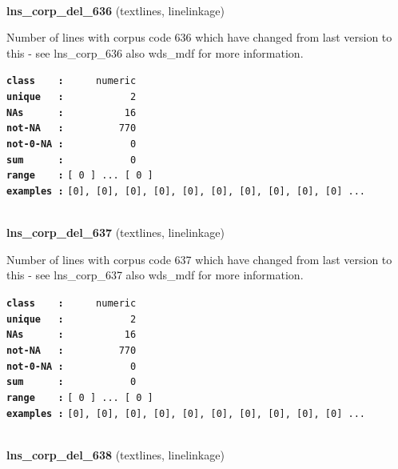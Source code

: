 \documentclass[]{article}
\begin{document}
~

\textbf{lns\_corp\_del\_636} (textlines, linelinkage)

Number of lines with corpus code 636 which have changed from last
version to this - see lns\_corp\_636 also wds\_mdf for more information.

\textbf{\texttt{class\ \ \ \ :}} \texttt{~~~~~numeric}\\
\textbf{\texttt{unique\ \ \ :}} \texttt{~~~~~~~~~~~2}\\
\textbf{\texttt{NAs\ \ \ \ \ \ :}} \texttt{~~~~~~~~~~16}\\
\textbf{\texttt{not-NA\ \ \ :}} \texttt{~~~~~~~~~770}\\
\textbf{\texttt{not-0-NA\ :}} \texttt{~~~~~~~~~~~0}\\
\textbf{\texttt{sum\ \ \ \ \ \ :}} \texttt{~~~~~~~~~~~0}\\
\textbf{\texttt{range\ \ \ \ :}}
\texttt{{[}\ 0\ {]}\ ...\ {[}\ 0\ {]}}\\
\textbf{\texttt{examples\ :}}
\texttt{{[}0{]},\ {[}0{]},\ {[}0{]},\ {[}0{]},\ {[}0{]},\ {[}0{]},\ {[}0{]},\ {[}0{]},\ {[}0{]},\ {[}0{]}\ ...}\\

~

\textbf{lns\_corp\_del\_637} (textlines, linelinkage)

Number of lines with corpus code 637 which have changed from last
version to this - see lns\_corp\_637 also wds\_mdf for more information.

\textbf{\texttt{class\ \ \ \ :}} \texttt{~~~~~numeric}\\
\textbf{\texttt{unique\ \ \ :}} \texttt{~~~~~~~~~~~2}\\
\textbf{\texttt{NAs\ \ \ \ \ \ :}} \texttt{~~~~~~~~~~16}\\
\textbf{\texttt{not-NA\ \ \ :}} \texttt{~~~~~~~~~770}\\
\textbf{\texttt{not-0-NA\ :}} \texttt{~~~~~~~~~~~0}\\
\textbf{\texttt{sum\ \ \ \ \ \ :}} \texttt{~~~~~~~~~~~0}\\
\textbf{\texttt{range\ \ \ \ :}}
\texttt{{[}\ 0\ {]}\ ...\ {[}\ 0\ {]}}\\
\textbf{\texttt{examples\ :}}
\texttt{{[}0{]},\ {[}0{]},\ {[}0{]},\ {[}0{]},\ {[}0{]},\ {[}0{]},\ {[}0{]},\ {[}0{]},\ {[}0{]},\ {[}0{]}\ ...}\\

~

\textbf{lns\_corp\_del\_638} (textlines, linelinkage)
\end{document}
